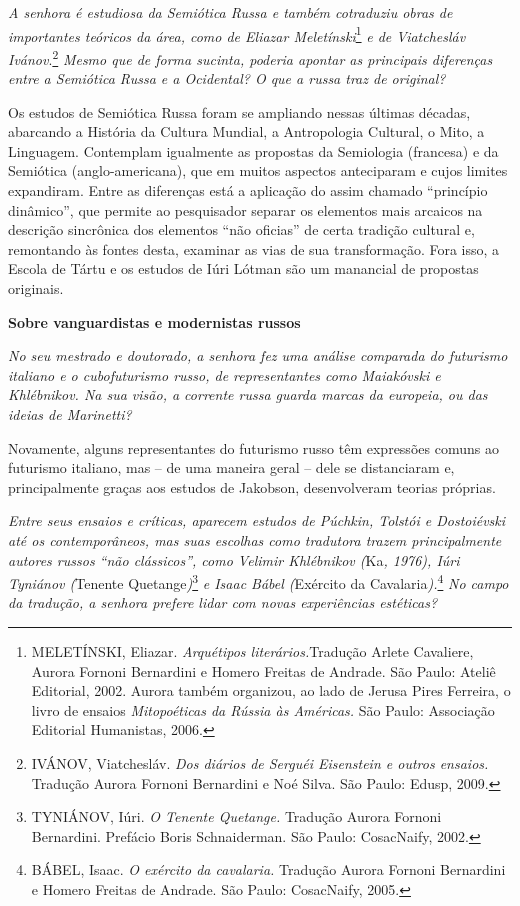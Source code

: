 \emph{A senhora é estudiosa da Semiótica Russa e também cotraduziu obras
de importantes teóricos da área, como de Eliazar Meletínski}\footnote{MELETÍNSKI,
  Eliazar. \emph{Arquétipos literários.}Tradução Arlete Cavaliere,
  Aurora Fornoni Bernardini e Homero Freitas de Andrade. São Paulo:
  Ateliê Editorial, 2002. Aurora também organizou, ao lado de Jerusa
  Pires Ferreira, o livro de ensaios \emph{Mitopoéticas da Rússia às
  Américas.} São Paulo: Associação Editorial Humanistas, 2006.} \emph{e
de Viatchesláv Ivánov}.\footnote{IVÁNOV, Viatchesláv. \emph{Dos diários
  de Serguéi Eisenstein e outros ensaios.} Tradução Aurora Fornoni
  Bernardini e Noé Silva. São Paulo: Edusp, 2009.} \emph{Mesmo que de
forma sucinta, poderia apontar as principais diferenças entre a
Semiótica Russa e a Ocidental? O que a russa traz de original?~}

Os estudos de Semiótica Russa foram se ampliando nessas últimas décadas,
abarcando a História da Cultura Mundial, a Antropologia Cultural, o
Mito, a Linguagem. Contemplam igualmente as propostas da Semiologia
(francesa) e da Semiótica (anglo-americana), que em muitos aspectos
anteciparam e cujos limites expandiram. Entre as diferenças está a
aplicação do assim chamado ``princípio dinâmico'', que permite ao
pesquisador separar os elementos mais arcaicos na descrição sincrônica
dos elementos ``não oficias'' de certa tradição cultural e, remontando
às fontes desta, examinar as vias de sua transformação. Fora isso, a
Escola de Tártu e os estudos de Iúri Lótman são um manancial de
propostas originais.

\textbf{Sobre vanguardistas e modernistas russos}

\emph{No seu mestrado e doutorado, a senhora fez uma análise comparada
do futurismo italiano e o cubofuturismo russo, de representantes como
Maiakóvski e Khlébnikov. Na sua visão, a corrente russa guarda marcas da
europeia, ou das ideias de Marinetti?}

Novamente, alguns representantes do futurismo russo têm expressões
comuns ao futurismo italiano, mas -- de uma maneira geral -- dele se
distanciaram e, principalmente graças aos estudos de Jakobson,
desenvolveram teorias próprias.

\emph{Entre seus ensaios e críticas, aparecem estudos de Púchkin,
Tolstói e Dostoiévski até os contemporâneos, mas suas escolhas como
tradutora trazem principalmente autores russos ``não clássicos'', como
Velimir Khlébnikov (}Ka\emph{, 1976), Iúri Tyniánov (}Tenente
Quetange\emph{)}\footnote{TYNIÁNOV, Iúri. \emph{O Tenente Quetange.}
  Tradução Aurora Fornoni Bernardini. Prefácio Boris Schnaiderman. São
  Paulo: CosacNaify, 2002.} \emph{e Isaac Bábel (}Exército da
Cavalaria\emph{).}\footnote{BÁBEL, Isaac. \emph{O exército da
  cavalaria.} Tradução Aurora Fornoni Bernardini e Homero Freitas de
  Andrade. São Paulo: CosacNaify, 2005.} \emph{No campo da tradução, a
senhora prefere lidar com novas experiências estéticas?}

